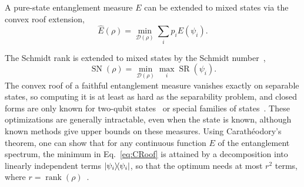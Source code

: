 \documentclass[11pt,a4paper]{report}
\newcounter{reptag}
\newif\iftags \tagsfalse   %
\newcommand{\reptagbox}[3]{\iftags\par\smallskip\noindent\refstepcounter{reptag}%
  \fcolorbox{#1}{#1!7}{\parbox{\dimexpr\linewidth-2\fboxsep-2\fboxrule\relax}{\small
  \textcolor{#1}{\textbf{[\thereptag]\ #2.}}\ #3}}\par\smallskip\fi}
\newcommand{\detail}[1]{\reptagbox{tagD}{More detail}{#1}}
\begin{document}
A pure-state entanglement measure $E$ can be extended to mixed states via the convex roof extension,
\begin{equation}\label{eq:CRoof}
    \widehat{E}(\rho) = \min_{\mathcal{D}(\rho)} \sum_i p_i E(\psi_i).
\end{equation}

The Schmidt rank is extended to mixed states by the Schmidt number~\cite{Terhal_2000},
\begin{equation}\label{eq:SN}
    \operatorname{SN}(\rho) = \min_{\mathcal{D}(\rho)} \max_i \operatorname{SR}(\psi_i).
\end{equation}
The convex roof of a faithful entanglement measure vanishes exactly on separable states, so computing it is at least as hard as the separability problem, and closed forms are only known for two-qubit states~\cite{Wootters1998} or special families of states~\cite{TerhalVollbrecht2000,VollbrechtWerner2001}.
These optimizations are generally intractable, even when the state is known, although known methods give upper bounds on these measures. Using Carath\'eodory's theorem, one can show that for any continuous function $E$ of the entanglement spectrum, the minimum in Eq.~\eqref{eq:CRoof} is attained by a decomposition into linearly independent terms $\dyad{\psi_i}$, so that the optimum needs at most $r^2$ terms, where $r=\operatorname{rank}(\rho)$~\cite{Uhlmann1998}.

\detail{Define bound entanglement here (PPT entangled states cannot be distilled), since the test states of the figures are bound entangled. Then explain why the convex roof is hard: decompositions are parametrised by isometries (HJW, Sec.~\ref{app:HJW}), the problem is non-convex, the optimum may need up to $r^2$ terms, and closed forms exist only in special cases (Wootters' formula for two qubits, isotropic and Werner states). A figure of one two-qubit state written as two different ensembles helps here.}
\end{document}
